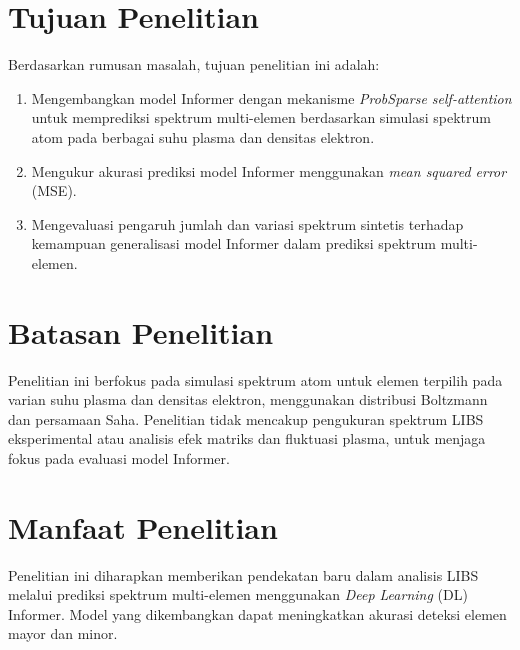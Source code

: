 \section{Tujuan Penelitian}
Berdasarkan rumusan masalah, tujuan penelitian ini adalah:
\begin{enumerate}

    \item Mengembangkan model Informer dengan mekanisme \textit{ProbSparse self-attention} untuk memprediksi spektrum multi-elemen berdasarkan simulasi spektrum atom pada berbagai suhu plasma dan densitas elektron.
    \item Mengukur akurasi prediksi model Informer menggunakan \textit{mean squared error} (MSE).
    \item Mengevaluasi pengaruh jumlah dan variasi spektrum sintetis terhadap kemampuan generalisasi model Informer dalam prediksi spektrum multi-elemen.
\end{enumerate}
\section{Batasan Penelitian}
Penelitian ini berfokus pada simulasi spektrum atom untuk elemen terpilih pada varian suhu plasma dan densitas elektron, menggunakan distribusi Boltzmann dan persamaan Saha. Penelitian tidak mencakup pengukuran spektrum LIBS eksperimental atau analisis efek matriks dan fluktuasi plasma, untuk menjaga fokus pada evaluasi model Informer.

\section{Manfaat Penelitian}
Penelitian ini diharapkan memberikan pendekatan baru dalam analisis LIBS melalui prediksi spektrum multi-elemen menggunakan \textit{Deep Learning} (DL) Informer. Model yang dikembangkan dapat meningkatkan akurasi deteksi elemen mayor dan minor.
